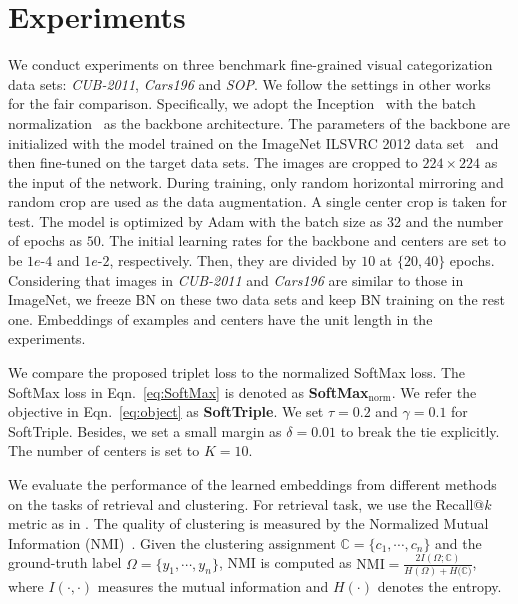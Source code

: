 \documentclass[10pt,twocolumn,letterpaper]{article}
\begin{document}
\section{Experiments}
\label{sec:exp}
We conduct experiments on three benchmark fine-grained visual categorization data sets: \textit{CUB-2011}, \textit{Cars196} and \textit{SOP}. We follow the settings in other works~\cite{GeHDS18,Attias17} for the fair comparison. Specifically, we adopt the Inception~\cite{SzegedyLJSRAEVR15} with the batch normalization~\cite{IoffeS15} as the backbone architecture. The parameters of the backbone are initialized with the model trained on the ImageNet ILSVRC 2012 data set~\cite{ILSVRC15} and then fine-tuned on the target data sets. The images are cropped to $224\times 224$ as the input of the network. During training, only random horizontal mirroring and random crop are used as the data augmentation. A single center crop is taken for test. The model is optimized by Adam with the batch size as 32 and the number of epochs as $50$. The initial learning rates for the backbone and centers are set to be $1e\mbox{-}4$ and $1e\mbox{-}2$, respectively. Then, they are divided by $10$ at $\{20, 40\}$ epochs. Considering that images in \textit{CUB-2011} and \textit{Cars196} are similar to those in ImageNet, we freeze BN on these two data sets and keep BN training on the rest one. Embeddings of examples and centers have the unit length in the experiments.

We compare the proposed triplet loss to the normalized SoftMax loss. The SoftMax loss in Eqn.~\ref{eq:SoftMax} is denoted as \textbf{SoftMax$_\mathrm{norm}$}. We refer the objective in Eqn.~\ref{eq:object} as \textbf{SoftTriple}. We set $\tau = 0.2$ and $\gamma=0.1$ for SoftTriple. Besides, we set a small margin as $\delta= 0.01$ to break the tie explicitly. The number of centers is set to $K=10$.

We evaluate the performance of the learned embeddings from different methods on the tasks of retrieval and clustering. For retrieval task, we use the Recall@$k$ metric as in \cite{SongXJS16}. The quality of clustering is measured by the Normalized Mutual Information ($\mathrm{NMI}$)~\cite{manning2010}. Given the clustering assignment $\mathbb{C} = \{c_1,\cdots,c_n\}$ and the ground-truth label $\Omega=\{y_1,\cdots,y_n\}$, NMI is computed as
$\mathrm{NMI} = \frac{2 I(\Omega;\mathcal{\mathbb{C}})}{H(\Omega)+H(\mathcal{\mathbb{C})}}$, where $I(\cdot,\cdot)$ measures the mutual information and $H(\cdot)$ denotes the entropy.
\end{document}
